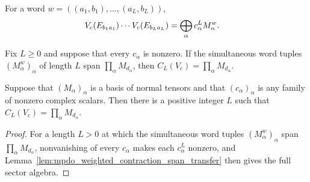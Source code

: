 \begin{lemma}
    \label{lem:mpdo_weighted_contraction_matrix_unit_words}
    \leanok
    For a word $w=((a_1,b_1),\ldots,(a_L,b_L))$,
    \begin{align}
        V_c(E_{b_1a_1})\cdots V_c(E_{b_La_L})
         & =\bigoplus_\alpha c_\alpha^L M_\alpha^w.
        \notag
    \end{align}
\end{lemma}

\begin{lemma}
    \label{lem:mpdo_weighted_contraction_span_transfer}
    \leanok
    Fix $L\geq0$ and suppose that every $c_\alpha$ is nonzero. If the
    simultaneous word tuples $(M_\alpha^w)_\alpha$ of length $L$ span
    $\prod_\alpha M_{d_\alpha}$, then
    $C_L(V_c)=\prod_\alpha M_{d_\alpha}$.
\end{lemma}

\begin{lemma}
    \label{thm:mpdo_nonzero_weight_vertical_bond_contractions_generate_sector_algebra}
    \leanok
    Suppose that $(M_\alpha)_\alpha$ is a basis of normal tensors and that
    $(c_\alpha)_\alpha$ is any family of nonzero complex scalars. Then there
    is a positive integer $L$ such that
    $C_L(V_c)=\prod_\alpha M_{d_\alpha}$.
\end{lemma}

\begin{proof}\leanok
    For a length $L>0$ at which the simultaneous word tuples
    $(M_\alpha^w)_\alpha$ span $\prod_\alpha M_{d_\alpha}$, nonvanishing of
    every $c_\alpha$ makes each $c_\alpha^L$ nonzero, and
    Lemma~\ref{lem:mpdo_weighted_contraction_span_transfer} then gives the
    full sector algebra.
\end{proof}

